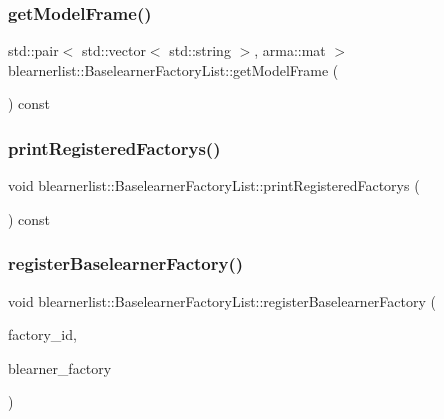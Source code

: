 \subsubsection{\texorpdfstring{get\+Model\+Frame()}{getModelFrame()}}
{\footnotesize\ttfamily std\+::pair$<$ std\+::vector$<$ std\+::string $>$, arma\+::mat $>$ blearnerlist\+::\+Baselearner\+Factory\+List\+::get\+Model\+Frame (\begin{DoxyParamCaption}{ }\end{DoxyParamCaption}) const}

\mbox{\label{classblearnerlist_1_1_baselearner_factory_list_a1d0242c96044f78c448183ed4a97e079}} 
\subsubsection{\texorpdfstring{print\+Registered\+Factorys()}{printRegisteredFactorys()}}
{\footnotesize\ttfamily void blearnerlist\+::\+Baselearner\+Factory\+List\+::print\+Registered\+Factorys (\begin{DoxyParamCaption}{ }\end{DoxyParamCaption}) const}

\mbox{\label{classblearnerlist_1_1_baselearner_factory_list_a6f5d8eb26f5f5ae4856d62eb9d649f4f}} 
\subsubsection{\texorpdfstring{register\+Baselearner\+Factory()}{registerBaselearnerFactory()}}
{\footnotesize\ttfamily void blearnerlist\+::\+Baselearner\+Factory\+List\+::register\+Baselearner\+Factory (\begin{DoxyParamCaption}\item[{const std\+::string \&}]{factory\+\_\+id,  }\item[{\mbox{\hyperlink{classblearnerfactory_1_1_baselearner_factory}{blearnerfactory\+::\+Baselearner\+Factory}} $\ast$}]{blearner\+\_\+factory }\end{DoxyParamCaption})}



